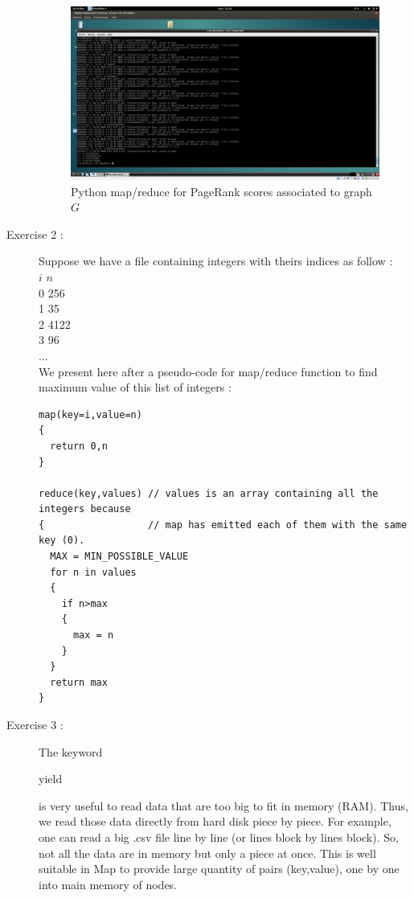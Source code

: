 \documentclass[pdftex,a4paper,DIV15]{scrartcl}
\begin{document}
\begin{description}
\begin{figure}[H]
\begin{center}
\includegraphics[scale=0.2]{images/mapreduce.png}
\end{center}
\caption{Python map/reduce for PageRank scores associated to graph $G$}
\label{mapreduce}
\end{figure}

\clearpage

\item[Exercise 2 :] Suppose we have a file containing integers with theirs indices as follow :\\

$i$ $n$\\
0 256 \\
1 35\\
2 4122\\
3 96\\
...\\

We present here after a pseudo-code for map/reduce function to find maximum value of this list of integers :\\

\begin{verbatim}
map(key=i,value=n)
{
  return 0,n
}

reduce(key,values) // values is an array containing all the integers because 
{                  // map has emitted each of them with the same key (0).
  MAX = MIN_POSSIBLE_VALUE
  for n in values
  {
    if n>max
    {
      max = n
    }
  }
  return max
}
\end{verbatim}

\item[Exercise 3 :] 

The keyword \begin{itshape}yield\end{itshape} is very useful to read data that are too big to fit in memory (RAM). Thus, we read those data directly from hard disk piece by piece.
For example, one can read a big .csv file line by line (or lines block by lines block). So, not all the data are in memory but only a piece at once. This is well suitable in
Map to provide large quantity of pairs (key,value), one by one into main memory of nodes.\\


\end{description}
\end{document}
